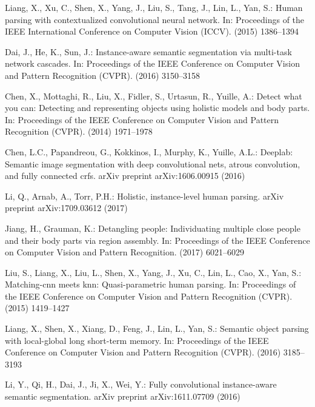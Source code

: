 \documentclass[10pt, letterpaper]{article}
\begin{document}
\begin{thebibliography}{10}
Liang, X., Xu, C., Shen, X., Yang, J., Liu, S., Tang, J., Lin, L., Yan, S.:
\newblock Human parsing with contextualized convolutional neural network.
\newblock In: Proceedings of the IEEE International Conference on Computer
  Vision (ICCV). (2015)  1386--1394

Dai, J., He, K., Sun, J.:
\newblock Instance-aware semantic segmentation via multi-task network cascades.
\newblock In: Proceedings of the IEEE Conference on Computer Vision and Pattern
  Recognition (CVPR). (2016)  3150--3158

Chen, X., Mottaghi, R., Liu, X., Fidler, S., Urtasun, R., Yuille, A.:
\newblock Detect what you can: Detecting and representing objects using
  holistic models and body parts.
\newblock In: Proceedings of the IEEE Conference on Computer Vision and Pattern
  Recognition (CVPR). (2014)  1971--1978

Chen, L.C., Papandreou, G., Kokkinos, I., Murphy, K., Yuille, A.L.:
\newblock Deeplab: Semantic image segmentation with deep convolutional nets,
  atrous convolution, and fully connected crfs.
\newblock arXiv preprint arXiv:1606.00915 (2016)

Li, Q., Arnab, A., Torr, P.H.:
\newblock Holistic, instance-level human parsing.
\newblock arXiv preprint arXiv:1709.03612 (2017)

Jiang, H., Grauman, K.:
\newblock Detangling people: Individuating multiple close people and their body
  parts via region assembly.
\newblock In: Proceedings of the IEEE Conference on Computer Vision and Pattern
  Recognition. (2017)  6021--6029

Liu, S., Liang, X., Liu, L., Shen, X., Yang, J., Xu, C., Lin, L., Cao, X., Yan,
  S.:
\newblock Matching-cnn meets knn: Quasi-parametric human parsing.
\newblock In: Proceedings of the IEEE Conference on Computer Vision and Pattern
  Recognition (CVPR). (2015)  1419--1427

Liang, X., Shen, X., Xiang, D., Feng, J., Lin, L., Yan, S.:
\newblock Semantic object parsing with local-global long short-term memory.
\newblock In: Proceedings of the IEEE Conference on Computer Vision and Pattern
  Recognition (CVPR). (2016)  3185--3193

Li, Y., Qi, H., Dai, J., Ji, X., Wei, Y.:
\newblock Fully convolutional instance-aware semantic segmentation.
\newblock arXiv preprint arXiv:1611.07709 (2016)


\end{thebibliography}
\end{document}
